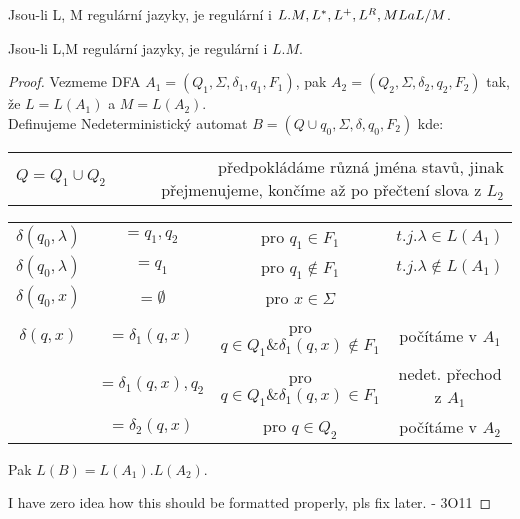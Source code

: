 \documentclass[../main.tex]{subfiles}
\begin{document}
\begin{theorem}
    Jsou-li L, M regulární jazyky, je regulární i $L.M, L^*,L^+, L^R, M\\L a L/M$.
\end{theorem}
\begin{theorem}
    Jsou-li L,M regulární jazyky, je regulární i $L.M$.
\end{theorem}
\begin{proof}
    Vezmeme DFA $A_1 = (Q_1,\Sigma, \delta_1, q_1, F_1)$,
    pak $A_2 = (Q_2,\Sigma, \delta_2,q_2,F_2)$ tak, že $L = L(A_1)$ a $M = L(A_2)$.
    \\ Definujeme Nedeterministický automat $B = (Q\cup {q_0},\Sigma, \delta, q_0,F_2)$ kde:

    \begin{tabular}{l r}
        $Q = Q_1 \cup Q_2$ & předpokládáme různá jména stavů, jinak přejmenujeme, končíme až po přečtení slova z $L_2$ \\        
    \end{tabular}
    \begin{tabular}{c|c|c|c}
        $\delta(q_0,\lambda)$ & $={q_1,q_2}$ & pro $q_1 \in F_1$ & $t.j. \lambda \in L(A_1)$ \\
        $\delta(q_0,\lambda)$ & $={q_1}$ & pro $q_1 \notin F_1$ & $t.j. \lambda \notin L(A_1)$ \\
        $\delta(q_0,x)$ & $=\emptyset$ & pro $x \in \Sigma$ & \space \\
        $\delta(q,x)$ & $={\delta_1(q,x)}$ & pro $q \in Q_1 \& \delta_1(q,x) \notin F_1$ & počítáme v $A_1$\\
        \space & $={\delta_1(q,x),q_2}$ & pro $q \in Q_1 \& \delta_1(q,x) \in F_1$ & nedet. přechod z $A_1$\\
        \space & $={\delta_2(q,x)}$ & pro $q \in Q_2$  & počítáme v $A_2$\\
    \end{tabular}

    Pak $L(B) = L(A_1).L(A_2)$.

    I have zero idea how this should be formatted properly, pls fix later. - 3O11
\end{proof}
\end{document}
